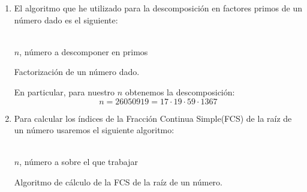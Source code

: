 	\begin{enumerate}
		\item El algoritmo que he utilizado para la descomposición en factores primos de un número dado es el
		siguiente:
		\begin{algorithm}[H]
			\begin{algorithmic}[1]
				\REQUIRE \ \\
					\texttt{$n$}, número a descomponer en primos \
					\ENDWHILE
				\ENDWHILE
				
				\ENDIF
			\end{algorithmic}
			\caption{Factorización de un número dado.}
			\label{Factors}
		\end{algorithm}
		
		En particular, para nuestro $n$ obtenemos la descomposición:
		$$n = 26050919 = 17 \cdot 19 \cdot 59 \cdot 1367$$
		
		\item Para calcular los índices de la Fracción Continua Simple(FCS) de la raíz de un número usaremos el
		siguiente algoritmo:
		\begin{algorithm}[H]
			\begin{algorithmic}[1]
				\REQUIRE \ \\
					\texttt{$n$}, número a sobre el que trabajar \
				\STATE{\texttt{$i = 0$}}
				\STATE{\texttt{$P_i = 0$}}
				\ENDWHILE
			\end{algorithmic}
			\caption{Algoritmo de cálculo de la FCS de la raíz de un número.}
			\label{FCS}
		\end{algorithm}
		

\end{enumerate}
